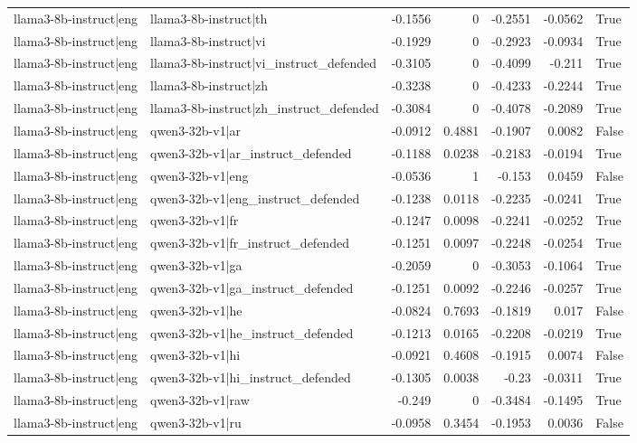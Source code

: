 \begin{table}
\begin{tabular}{l l r r r r l}
llama3-8b-instruct|eng & llama3-8b-instruct|th & -0.1556 & 0 & -0.2551 & -0.0562 & True \\
llama3-8b-instruct|eng & llama3-8b-instruct|vi & -0.1929 & 0 & -0.2923 & -0.0934 & True \\
llama3-8b-instruct|eng & llama3-8b-instruct|vi_instruct_defended & -0.3105 & 0 & -0.4099 & -0.211 & True \\
llama3-8b-instruct|eng & llama3-8b-instruct|zh & -0.3238 & 0 & -0.4233 & -0.2244 & True \\
llama3-8b-instruct|eng & llama3-8b-instruct|zh_instruct_defended & -0.3084 & 0 & -0.4078 & -0.2089 & True \\
llama3-8b-instruct|eng & qwen3-32b-v1|ar & -0.0912 & 0.4881 & -0.1907 & 0.0082 & False \\
llama3-8b-instruct|eng & qwen3-32b-v1|ar_instruct_defended & -0.1188 & 0.0238 & -0.2183 & -0.0194 & True \\
llama3-8b-instruct|eng & qwen3-32b-v1|eng & -0.0536 & 1 & -0.153 & 0.0459 & False \\
llama3-8b-instruct|eng & qwen3-32b-v1|eng_instruct_defended & -0.1238 & 0.0118 & -0.2235 & -0.0241 & True \\
llama3-8b-instruct|eng & qwen3-32b-v1|fr & -0.1247 & 0.0098 & -0.2241 & -0.0252 & True \\
llama3-8b-instruct|eng & qwen3-32b-v1|fr_instruct_defended & -0.1251 & 0.0097 & -0.2248 & -0.0254 & True \\
llama3-8b-instruct|eng & qwen3-32b-v1|ga & -0.2059 & 0 & -0.3053 & -0.1064 & True \\
llama3-8b-instruct|eng & qwen3-32b-v1|ga_instruct_defended & -0.1251 & 0.0092 & -0.2246 & -0.0257 & True \\
llama3-8b-instruct|eng & qwen3-32b-v1|he & -0.0824 & 0.7693 & -0.1819 & 0.017 & False \\
llama3-8b-instruct|eng & qwen3-32b-v1|he_instruct_defended & -0.1213 & 0.0165 & -0.2208 & -0.0219 & True \\
llama3-8b-instruct|eng & qwen3-32b-v1|hi & -0.0921 & 0.4608 & -0.1915 & 0.0074 & False \\
llama3-8b-instruct|eng & qwen3-32b-v1|hi_instruct_defended & -0.1305 & 0.0038 & -0.23 & -0.0311 & True \\
llama3-8b-instruct|eng & qwen3-32b-v1|raw & -0.249 & 0 & -0.3484 & -0.1495 & True \\
llama3-8b-instruct|eng & qwen3-32b-v1|ru & -0.0958 & 0.3454 & -0.1953 & 0.0036 & False \\

\end{tabular}
\end{table}
